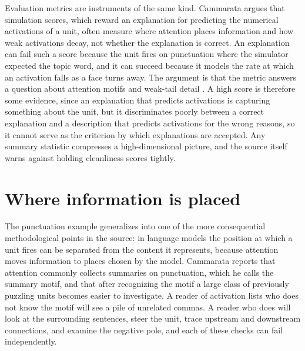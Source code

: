 \documentclass[11pt]{article}
\begin{document}
Evaluation metrics are instruments of the same kind. Cammarata argues that simulation scores, which reward an explanation for predicting the numerical activations of a unit, often measure where attention places information and how weak activations decay, not whether the explanation is correct. An explanation can fail such a score because the unit fires on punctuation where the simulator expected the topic word, and it can succeed because it models the rate at which an activation falls as a face turns away. The argument is that the metric answers a question about attention motifs and weak-tail detail \cite[\emph{On Simulation Scores}]{cammarata}. A high score is therefore some evidence, since an explanation that predicts activations is capturing something about the unit, but it discriminates poorly between a correct explanation and a description that predicts activations for the wrong reasons, so it cannot serve as the criterion by which explanations are accepted. Any summary statistic compresses a high-dimensional picture, and the source itself warns against holding cleanliness scores tightly.

\section{Where information is placed}

The punctuation example generalizes into one of the more consequential methodological points in the source: in language models the position at which a unit fires can be separated from the content it represents, because attention moves information to places chosen by the model. Cammarata reports that attention commonly collects summaries on punctuation, which he calls the summary motif, and that after recognizing the motif a large class of previously puzzling units becomes easier to investigate. A reader of activation lists who does not know the motif will see a pile of unrelated commas. A reader who does will look at the surrounding sentences, steer the unit, trace upstream and downstream connections, and examine the negative pole, and each of these checks can fail independently.
\end{document}
